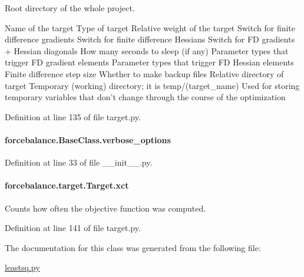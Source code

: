 Root directory of the whole project. 

Name of the target Type of target Relative weight of the target Switch for finite difference gradients Switch for finite difference Hessians Switch for F\-D gradients + Hessian diagonals How many seconds to sleep (if any) Parameter types that trigger F\-D gradient elements Parameter types that trigger F\-D Hessian elements Finite difference step size Whether to make backup files Relative directory of target Temporary (working) directory; it is temp/(target\-\_\-name) Used for storing temporary variables that don't change through the course of the optimization 

Definition at line 135 of file target.\-py.

\hypertarget{classforcebalance_1_1BaseClass_afd68efa29ccd2f320f4cf82198214aac}{
\paragraph[{verbose\-\_\-options}]{\setlength{\rightskip}{0pt plus 5cm}forcebalance.\-Base\-Class.\-verbose\-\_\-options\hspace{0.3cm}{\ttfamily [inherited]}}}\label{classforcebalance_1_1BaseClass_afd68efa29ccd2f320f4cf82198214aac}


Definition at line 33 of file \-\_\-\-\_\-init\-\_\-\-\_\-.\-py.

\hypertarget{classforcebalance_1_1target_1_1Target_aad2e385cfbf7b4a68f1c2cb41133fe82}{
\paragraph[{xct}]{\setlength{\rightskip}{0pt plus 5cm}forcebalance.\-target.\-Target.\-xct\hspace{0.3cm}{\ttfamily [inherited]}}}\label{classforcebalance_1_1target_1_1Target_aad2e385cfbf7b4a68f1c2cb41133fe82}


Counts how often the objective function was computed. 



Definition at line 141 of file target.\-py.



The documentation for this class was generated from the following file\-:\begin{DoxyCompactItemize}
\item 
\hyperlink{leastsq_8py}{leastsq.\-py}\end{DoxyCompactItemize}
